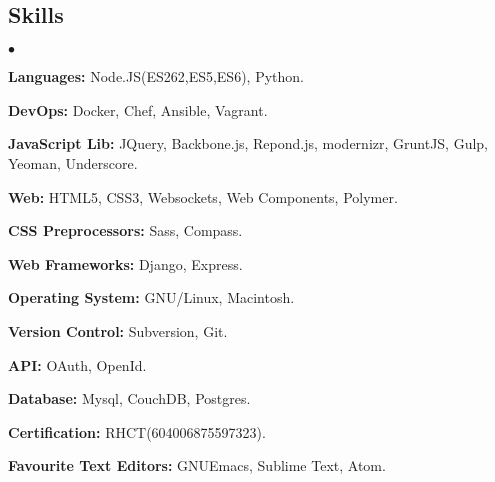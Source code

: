 \documentclass[margin, line, 10pt]{res}
\newenvironment{list2}{
  \begin{list}{$\bullet$}{%
      \setlength{\itemsep}{0in}
      \setlength{\parsep}{0in} \setlength{\parskip}{0in}
      \setlength{\topsep}{0in} \setlength{\partopsep}{0in}
      \setlength{\leftmargin}{0.2in}}}{\end{list}}
\begin{document}
\begin{resume}
\section{Skills}
\begin{list2}
\item {\bf Languages:} Node.JS(ES262,ES5,ES6), Python.\\
\vspace{-.3cm}
\item {\bf DevOps:} Docker, Chef, Ansible, Vagrant.\\
\vspace{-.3cm}
\item {\bf JavaScript Lib:} JQuery, Backbone.js, Repond.js, modernizr, GruntJS, Gulp, Yeoman, Underscore.\\
\vspace{-.3cm}
\item {\bf Web:} HTML5, CSS3, Websockets, Web Components, Polymer.\\
\vspace{-.3cm}
\item {\bf CSS Preprocessors:} Sass, Compass.\\
\vspace{-.3cm}
\item {\bf Web Frameworks:} Django, Express.\\
\vspace{-.3cm}
\item {\bf Operating System:} GNU/Linux, Macintosh.\\
\vspace{-.3cm}
\item {\bf Version Control:} Subversion, Git.\\
\vspace{-.3cm}
\item {\bf API:} OAuth, OpenId.\\
\vspace{-.3cm}
\item {\bf Database:} Mysql, CouchDB, Postgres.\\
\vspace{-.3cm}
\item {\bf Certification:} RHCT(604006875597323).\\
\vspace{-.3cm}
\item {\bf Favourite Text Editors:} GNUEmacs, Sublime Text, Atom.\\
\vspace{-.3cm}
\end{list2}


\end{resume}
\end{document}
